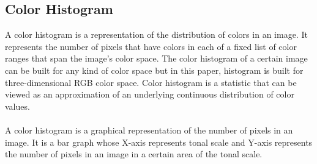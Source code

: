 \documentclass{report}
\begin{document}
\subsection{Color Histogram}
A color histogram is a representation of the distribution of colors in an image. It represents the number of pixels that have colors in each of a fixed list of color ranges that span the image’s color space. The color histogram of a certain image can be built for any kind of color space but in this paper, histogram is built for three-dimensional RGB color space. Color histogram is a statistic that can be viewed as an approximation of an underlying continuous distribution of color values.\\
\\
A color histogram is a graphical representation of the number of pixels in an image. It is a bar graph whose X-axis represents tonal scale and Y-axis represents the number of pixels in an image in a certain area of the tonal scale.\\
\end{document}
